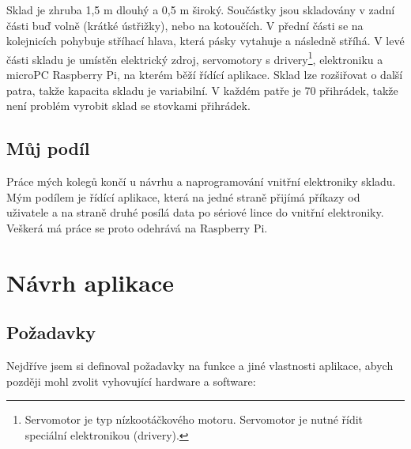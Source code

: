 \documentclass[12pt, a4paper, oneside]{article}
\begin{document}
Sklad je zhruba 1,5 m dlouhý a 0,5 m široký. Součástky jsou skladovány v zadní části buď volně (krátké ústřižky), nebo na kotoučích. V přední části se na kolejnicích pohybuje stříhací hlava, která pásky vytahuje a následně stříhá. V levé části skladu je umístěn elektrický zdroj, servomotory s drivery\footnote{Servomotor je typ nízkootáčkového motoru. Servomotor je nutné řídit speciální elektronikou (drivery).}, elektroniku a microPC Raspberry Pi, na kterém běží řídící aplikace. Sklad lze rozšiřovat o další patra, takže kapacita skladu je variabilní. V každém patře je 70 přihrádek, takže není problém vyrobit sklad se stovkami přihrádek.

\subsection{Můj podíl}

Práce mých kolegů končí u návrhu a naprogramování vnitřní elektroniky skladu. Mým podílem je řídící aplikace, která na jedné straně přijímá příkazy od uživatele a na straně druhé posílá data po sériové lince do vnitřní elektroniky. Veškerá má práce se proto odehrává na Raspberry Pi.

\section{Návrh aplikace}

\subsection{Požadavky}

Nejdříve jsem si definoval požadavky na funkce a jiné vlastnosti aplikace, abych později mohl zvolit vyhovující hardware a software:
\end{document}
